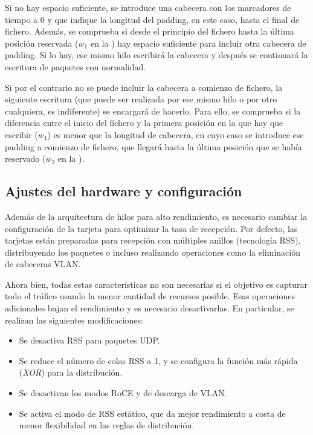 \documentclass[oneside, draft]{epstfg}
\begin{document}
Si no hay espacio suficiente, se introduce una cabecera con los marcadores de tiempo a 0 y que indique la longitud del \gls{padding}, en este caso, hasta el final de fichero. Además, se comprueba si desde el principio del fichero hasta la última posición reservada ($w_1$ en la ) hay espacio suficiente para incluir otra cabecera de \gls{padding}. Si lo hay, ese mismo hilo escribirá la cabecera y después se continuará la escritura de paquetes con normalidad.

Si por el contrario no se puede incluir la cabecera a comienzo de fichero, la siguiente escritura (que puede ser realizada por ese mismo hilo o por otro cualquiera, es indiferente) se encargará de hacerlo. Para ello, se comprueba si la diferencia entre el inicio del fichero y la primera posición en la que hay que escribir ($w_1$) es menor que la longitud de cabecera, en cuyo caso se introduce ese \gls{padding} a comienzo de fichero, que llegará hasta la última posición que se había reservado ($w_2$ en la ).

\subsection{Ajustes del hardware y configuración}
\label{sec:Desarrollo:AjustesHardware}

Además de la arquitectura de hilos para alto rendimiento, es necesario cambiar la configuración de la tarjeta para optimizar la tasa de recepción. Por defecto, las tarjetas están preparadas para recepción con múltiples anillos (tecnología \gls{RSS}), distribuyendo los paquetes o incluso realizando operaciones como la eliminación de cabeceras VLAN.

Ahora bien, todas estas características no son necesarias si el objetivo es capturar todo el tráfico usando la menor cantidad de recursos posible. Esas operaciones adicionales bajan el rendimiento y es necesario desactivarlas. En particular, se realizan las siguientes modificaciones:

\begin{itemize}[itemsep = 0pt]
\item Se desactiva \gls{RSS} para paquetes UDP.
\item Se reduce el número de colas \gls{RSS} a 1, y se configura la función más rápida (\textit{XOR}) para la distribución.
\item Se desactivan los modos \gls{RoCE} y de descarga de VLAN.
\item Se activa el modo de \gls{RSS} estático, que da mejor rendimiento a costa de menor flexibilidad en las reglas de distribución.
\end{itemize}
\end{document}
